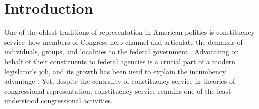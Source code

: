 \documentclass[12pt]{article}
\begin{document}

\onehalfspacing
\clearpage


\section{Introduction}

One of the oldest traditions of representation in American politics is constituency service--how members of Congress help channel and articulate the demands of individuals, groups, and localities to the federal government \citep{Fenno1978}. Advocating on behalf of their constituents to federal agencies is a crucial part of a modern legislator's job, and its growth has been used to explain the incumbency advantage \citep{King1991}. Yet, despite the centrality of constituency service in theories of congressional representation, constituency service remains one of the least understood congressional activities.%
\end{document}
